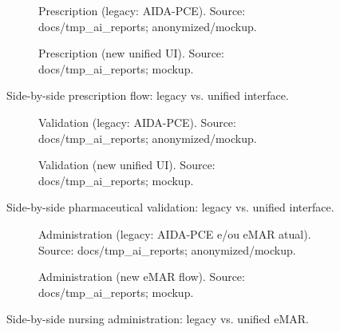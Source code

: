 \begin{figure}[htbp]
    \centering
    \begin{subfigure}[t]{0.47\textwidth}
        \centering
        \caption{Prescription (legacy: AIDA-PCE). Source: docs/tmp\_ai\_reports; anonymized/mockup.}
        \label{fig:prescription_legacy}
    \end{subfigure}
    \begin{subfigure}[t]{0.47\textwidth}
        \centering
        \caption{Prescription (new unified UI). Source: docs/tmp\_ai\_reports; mockup.}
        \label{fig:prescription_new}
    \end{subfigure}
    \caption{Side-by-side prescription flow: legacy vs. unified interface.}
\end{figure}

\begin{figure}[htbp]
    \centering
    \begin{subfigure}[t]{0.45\textwidth}
        \centering
        \caption{Validation (legacy: AIDA-PCE). Source: docs/tmp\_ai\_reports; anonymized/mockup.}
        \label{fig:validation_legacy}
    \end{subfigure}
    \begin{subfigure}[t]{0.45\textwidth}
        \centering
        \caption{Validation (new unified UI). Source: docs/tmp\_ai\_reports; mockup.}
        \label{fig:validation_new}
    \end{subfigure}
    \caption{Side-by-side pharmaceutical validation: legacy vs. unified interface.}
\end{figure}

\begin{figure}[htbp]
    \centering
    \begin{subfigure}[t]{0.45\textwidth}
        \centering
        \caption{Administration (legacy: AIDA-PCE e/ou eMAR atual). Source: docs/tmp\_ai\_reports; anonymized/mockup.}
        \label{fig:administration_legacy}
    \end{subfigure}
    \begin{subfigure}[t]{0.45\textwidth}
        \centering
        \caption{Administration (new eMAR flow). Source: docs/tmp\_ai\_reports; mockup.}
        \label{fig:administration_new}
    \end{subfigure}
    \caption{Side-by-side nursing administration: legacy vs. unified eMAR.}
\end{figure}

